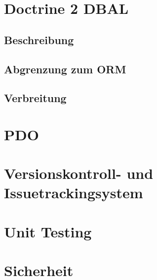 \section{Doctrine 2 DBAL}
	\subsection{Beschreibung}
	\subsection{Abgrenzung zum ORM}
	\subsection{Verbreitung}
\section{PDO}
\section{Versionskontroll- und Issuetrackingsystem}

\section{Unit Testing}

\section{Sicherheit}
